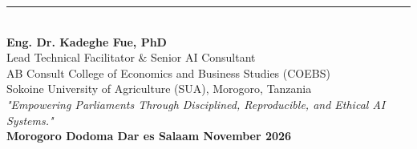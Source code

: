 \documentclass[11pt, a4paper]{report}
\begin{document}
\vspace{1.5cm}
\begin{center}
    \rule{0.65\textwidth}{0.4pt}\\[0.3cm]
    \textbf{\Large Eng. Dr. Kadeghe Fue, PhD}\\
    Lead Technical Facilitator \& Senior AI Consultant\\
    AB Consult \textbullet{} College of Economics and Business Studies (COEBS)\\
    Sokoine University of Agriculture (SUA), Morogoro, Tanzania\\[0.3cm]
    \small\textit{"Empowering Parliaments Through Disciplined, Reproducible, and Ethical AI Systems."}\\[0.5cm]
    \textbf{Morogoro \textbullet{} Dodoma \textbullet{} Dar es Salaam \textbullet{} November 2026}
\end{center}
\end{document}
